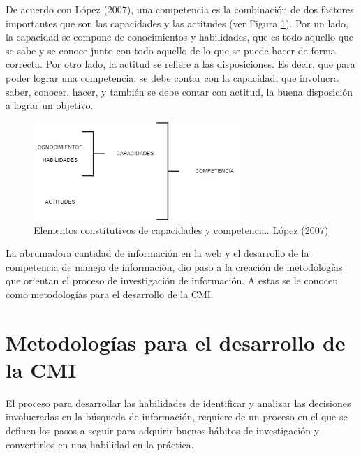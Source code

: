 De acuerdo con López (2007), una competencia es la combinación de dos factores importantes que son las capacidades y las actitudes (ver Figura \ref{fig:21}). Por un lado, la capacidad se compone de conocimientos y habilidades, que es todo aquello que se sabe y se conoce junto con todo aquello de lo que se puede hacer de forma correcta. Por otro lado, la actitud se refiere a las disposiciones. Es decir, que para poder lograr una competencia, se debe contar con la capacidad, que involucra saber, conocer, hacer, y también se debe contar con actitud, la buena disposición a lograr un objetivo.

\begin{figure}[H]
  \centering
  \includegraphics[width=0.70\textwidth]{Cap2/Figuras/CMI.jpg}
  \caption{Elementos constitutivos de capacidades y competencia. López (2007)}
  \label{fig:21}
\end{figure}

La abrumadora cantidad de información en la web y el desarrollo de la competencia de manejo de información, dio paso a la creación de metodologías que orientan el proceso de investigación de información. A estas se le conocen como metodologías para el desarrollo de la CMI.


\section{Metodologías para el desarrollo de la CMI}
\label{secMetodologiasCap2}

El proceso para desarrollar las habilidades de identificar y analizar las decisiones involucradas en la búsqueda de información, requiere de un proceso en el que se definen los pasos a seguir para adquirir buenos hábitos de investigación y convertirlos en una habilidad en la práctica.

